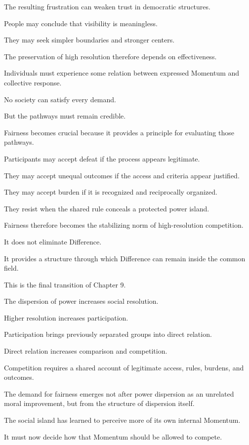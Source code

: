 The resulting frustration can weaken trust in democratic structures.

People may conclude that visibility is meaningless.

They may seek simpler boundaries and stronger centers.

The preservation of high resolution therefore depends on effectiveness.

Individuals must experience some relation between expressed Momentum and collective response.

No society can satisfy every demand.

But the pathways must remain credible.

Fairness becomes crucial because it provides a principle for evaluating those pathways.

Participants may accept defeat if the process appears legitimate.

They may accept unequal outcomes if the access and criteria appear justified.

They may accept burden if it is recognized and reciprocally organized.

They resist when the shared rule conceals a protected power island.

Fairness therefore becomes the stabilizing norm of high-resolution competition.

It does not eliminate Difference.

It provides a structure through which Difference can remain inside the common field.

This is the final transition of Chapter 9.

The dispersion of power increases social resolution.

Higher resolution increases participation.

Participation brings previously separated groups into direct relation.

Direct relation increases comparison and competition.

Competition requires a shared account of legitimate access, rules, burdens, and outcomes.

The demand for fairness emerges not after power dispersion as an unrelated moral improvement, but from the structure of dispersion itself.

The social island has learned to perceive more of its own internal Momentum.

It must now decide how that Momentum should be allowed to compete.

